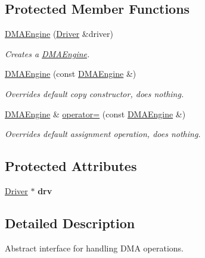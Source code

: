\subsection*{Protected Member Functions}
\begin{CompactItemize}
\item 
\hyperlink{classmprace_1_1DMAEngine_b0}{DMAEngine} (\hyperlink{classmprace_1_1Driver}{Driver} \&driver)
\begin{CompactList}\small\item\em Creates a \hyperlink{classmprace_1_1DMAEngine}{DMAEngine}. \item\end{CompactList}\item 
\hyperlink{classmprace_1_1DMAEngine_b1}{DMAEngine} (const \hyperlink{classmprace_1_1DMAEngine}{DMAEngine} \&)
\begin{CompactList}\small\item\em Overrides default copy constructor, does nothing. \item\end{CompactList}\item 
\hyperlink{classmprace_1_1DMAEngine}{DMAEngine} \& \hyperlink{classmprace_1_1DMAEngine_b2}{operator=} (const \hyperlink{classmprace_1_1DMAEngine}{DMAEngine} \&)
\begin{CompactList}\small\item\em Overrides default assignment operation, does nothing. \item\end{CompactList}\end{CompactItemize}
\subsection*{Protected Attributes}
\begin{CompactItemize}
\item 
\hypertarget{classmprace_1_1DMAEngine_p0}{
\hyperlink{classmprace_1_1Driver}{Driver} $\ast$ {\bf drv}}
\label{classmprace_1_1DMAEngine_p0}

\end{CompactItemize}


\subsection{Detailed Description}
Abstract interface for handling DMA operations. 

